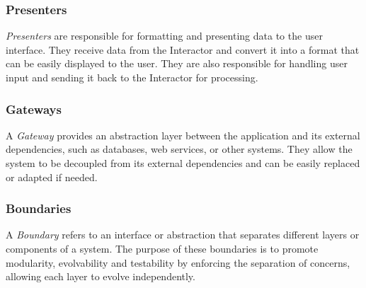\subsubsection{Presenters}
\textit{Presenters} are responsible for formatting and presenting data to the user
interface. They receive data from the Interactor and convert it into a format that can be
easily displayed to the user. They are also responsible for handling user input and
sending it back to the Interactor for processing.

\subsubsection{Gateways}
A \textit{Gateway} provides an abstraction layer between the application and its external
dependencies, such as databases, web services, or other systems. They allow the
system to be decoupled from its external dependencies and can be easily replaced or
adapted if needed.

\subsubsection{Boundaries}
A \textit{Boundary} refers to an interface or abstraction that separates different layers
or components of a system. The purpose of these boundaries is to promote modularity,
evolvability and testability by enforcing the separation of concerns, allowing each layer
to evolve independently.